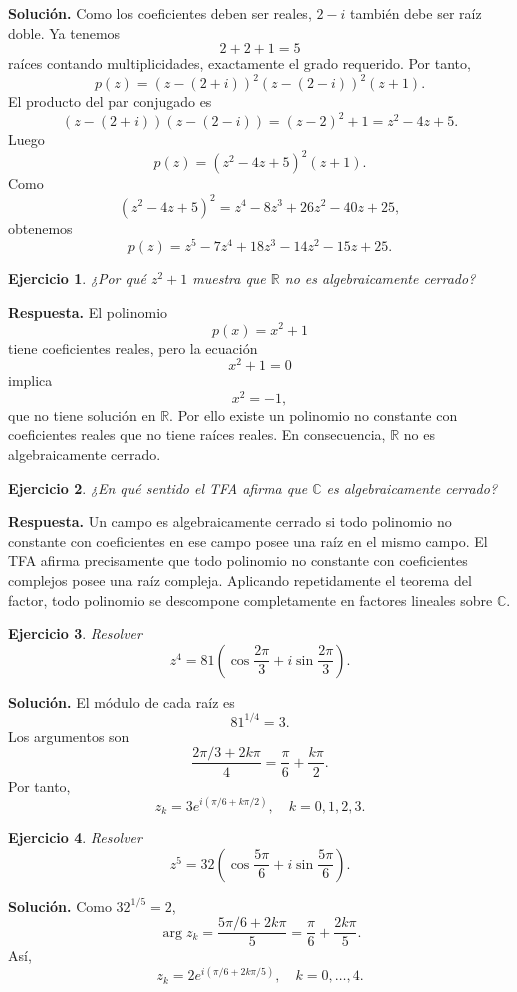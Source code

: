 \documentclass[12pt]{article}
\newtheorem{ejercicio}{Ejercicio}[section]
\newcommand{\C}{\mathbb{C}}
\begin{document}
\textbf{Solución.}
Como los coeficientes deben ser reales, $2-i$ también debe ser raíz doble.
Ya tenemos
\[
2+2+1=5
\]
raíces contando multiplicidades, exactamente el grado requerido. Por tanto,
\[
p(z)=(z-(2+i))^2(z-(2-i))^2(z+1).
\]
El producto del par conjugado es
\[
(z-(2+i))(z-(2-i))
=(z-2)^2+1
=z^2-4z+5.
\]
Luego
\[
p(z)=(z^2-4z+5)^2(z+1).
\]
Como
\[
(z^2-4z+5)^2=z^4-8z^3+26z^2-40z+25,
\]
obtenemos
\[
\boxed{
p(z)=z^5-7z^4+18z^3-14z^2-15z+25.
}
\]

\begin{ejercicio}
¿Por qué $z^2+1$ muestra que $\mathbb{R}$ no es algebraicamente cerrado?
\end{ejercicio}

\textbf{Respuesta.}
El polinomio
\[
p(x)=x^2+1
\]
tiene coeficientes reales, pero la ecuación
\[
x^2+1=0
\]
implica
\[
x^2=-1,
\]
que no tiene solución en $\mathbb{R}$. Por ello existe un polinomio no
constante con coeficientes reales que no tiene raíces reales. En consecuencia,
$\mathbb{R}$ no es algebraicamente cerrado.

\begin{ejercicio}
¿En qué sentido el TFA afirma que $\C$ es algebraicamente cerrado?
\end{ejercicio}

\textbf{Respuesta.}
Un campo es algebraicamente cerrado si todo polinomio no constante con
coeficientes en ese campo posee una raíz en el mismo campo. El TFA afirma
precisamente que todo polinomio no constante con coeficientes complejos posee
una raíz compleja. Aplicando repetidamente el teorema del factor, todo
polinomio se descompone completamente en factores lineales sobre $\C$.

\begin{ejercicio}
Resolver
\[
z^4=81\left(\cos\frac{2\pi}{3}+i\sin\frac{2\pi}{3}\right).
\]
\end{ejercicio}

\textbf{Solución.}
El módulo de cada raíz es
\[
81^{1/4}=3.
\]
Los argumentos son
\[
\frac{2\pi/3+2k\pi}{4}
=\frac{\pi}{6}+\frac{k\pi}{2}.
\]
Por tanto,
\[
\boxed{
z_k=3e^{i(\pi/6+k\pi/2)},\quad k=0,1,2,3.
}
\]

\begin{ejercicio}
Resolver
\[
z^5=32\left(\cos\frac{5\pi}{6}+i\sin\frac{5\pi}{6}\right).
\]
\end{ejercicio}

\textbf{Solución.}
Como $32^{1/5}=2$,
\[
\arg z_k=
\frac{5\pi/6+2k\pi}{5}
=\frac{\pi}{6}+\frac{2k\pi}{5}.
\]
Así,
\[
\boxed{
z_k=2e^{i(\pi/6+2k\pi/5)},\quad k=0,\ldots,4.
}
\]
\end{document}
